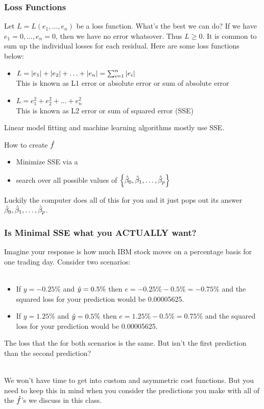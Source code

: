 \documentclass[slides]{beamer} %
\begin{document}
\begin{frame}\frametitle{Loss Functions}

\small
Let $L = L(e_1, \ldots, e_n)$ be a loss function. What's the best we can do?  \pause If we have $e_1 = 0, \ldots, e_n = 0$, then we have no error whatsover. Thus $L \geq 0$. \pause  It is common to sum up the individual losses for each residual. Here are some loss functions below:

\begin{itemize}
\item $L = \left|e_1\right| + \left|e_2\right| + \ldots + \left|e_n\right| = \sum_{i=1}^n \left|e_i\right|$ \\ \pause 
This is known as L1 error or absolute error or sum of absolute error \pause 
\item $L = e_1^2 + e_2^2 + \ldots + e_n^2$  \\ \pause 
This is known as L2 error or sum of squared error (SSE) \pause 
\end{itemize}

Linear model fitting and machine learning algorithms mostly use SSE.

\begin{block}{How to create $\hat{f}$} \pause 
\begin{itemize}
\item Minimize SSE via a  \pause 
\item search over all possible values of $\left\{\hat{\beta}_0, \hat{\beta}_1,  \ldots, \hat{\beta}_p\right\}$
\end{itemize}
\end{block}
 \pause 
Luckily the computer does all of this for you and it just pops out its answer $\hat{\beta}_0, \hat{\beta}_1,  \ldots, \hat{\beta}_p$.
	
\end{frame}

\begin{frame}\frametitle{Is Minimal SSE what you ACTUALLY want?}

Imagine your response is how much IBM stock moves on a percentage basis for one trading day. Consider two scenarios:\\~\\ \pause 

\begin{itemize}
\item If $y = -0.25\%$ and $\hat{y} = 0.5\%$ then $e = -0.25\% - 0.5\% = -0.75\%$ and the squared loss for your prediction would be 0.00005625.  \pause 
\item If $y = 1.25\%$ and $\hat{y} = 0.5\%$ then $e = 1.25\% - 0.5\% = 0.75\%$ and the squared loss for your prediction would be 0.00005625. 
\end{itemize}
	
The loss that the  for both scenarios is the same. But isn't the first prediction  than the second prediction? \\~\\ \pause 

We won't have time to get into custom and asymmetric cost functions. But you need to keep this in mind when you consider the predictions you make with all of the $\hat{f}$'s we discuss in this class.
\end{frame}
\end{document}
